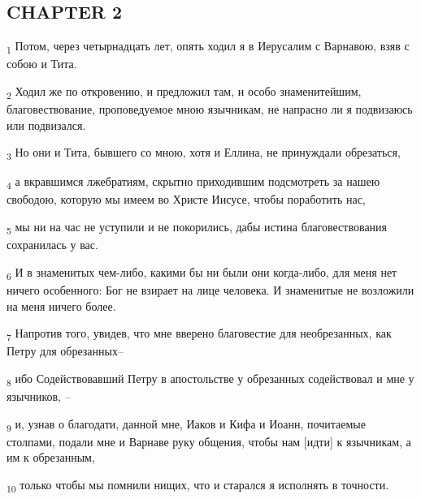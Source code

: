 \subsection{CHAPTER 2}
\begin{tcolorbox}
\textsubscript{1} Потом, через четырнадцать лет, опять ходил я в Иерусалим с Варнавою, взяв с собою и Тита.
\end{tcolorbox}
\begin{tcolorbox}
\textsubscript{2} Ходил же по откровению, и предложил там, и особо знаменитейшим, благовествование, проповедуемое мною язычникам, не напрасно ли я подвизаюсь или подвизался.
\end{tcolorbox}
\begin{tcolorbox}
\textsubscript{3} Но они и Тита, бывшего со мною, хотя и Еллина, не принуждали обрезаться,
\end{tcolorbox}
\begin{tcolorbox}
\textsubscript{4} а вкравшимся лжебратиям, скрытно приходившим подсмотреть за нашею свободою, которую мы имеем во Христе Иисусе, чтобы поработить нас,
\end{tcolorbox}
\begin{tcolorbox}
\textsubscript{5} мы ни на час не уступили и не покорились, дабы истина благовествования сохранилась у вас.
\end{tcolorbox}
\begin{tcolorbox}
\textsubscript{6} И в знаменитых чем-либо, какими бы ни были они когда-либо, для меня нет ничего особенного: Бог не взирает на лице человека. И знаменитые не возложили на меня ничего более.
\end{tcolorbox}
\begin{tcolorbox}
\textsubscript{7} Напротив того, увидев, что мне вверено благовестие для необрезанных, как Петру для обрезанных--
\end{tcolorbox}
\begin{tcolorbox}
\textsubscript{8} ибо Содействовавший Петру в апостольстве у обрезанных содействовал и мне у язычников, --
\end{tcolorbox}
\begin{tcolorbox}
\textsubscript{9} и, узнав о благодати, данной мне, Иаков и Кифа и Иоанн, почитаемые столпами, подали мне и Варнаве руку общения, чтобы нам [идти] к язычникам, а им к обрезанным,
\end{tcolorbox}
\begin{tcolorbox}
\textsubscript{10} только чтобы мы помнили нищих, что и старался я исполнять в точности.
\end{tcolorbox}
